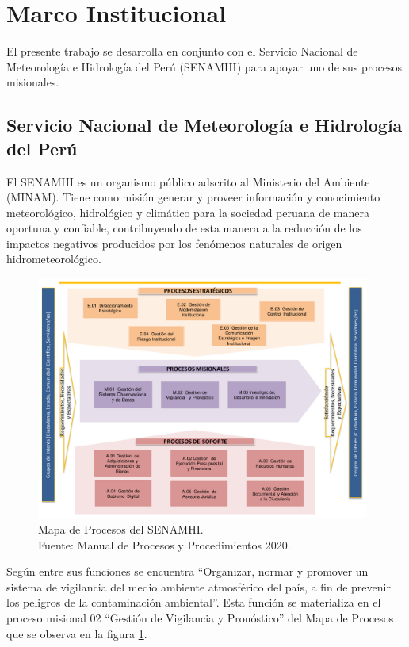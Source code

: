 \section{Marco Institucional}

El presente trabajo se desarrolla en conjunto con el Servicio Nacional de 
Meteorología e Hidrología del Perú (SENAMHI) para apoyar uno de sus procesos 
misionales.

\subsection{Servicio Nacional de Meteorología e Hidrología del Perú}

El SENAMHI es un organismo público adscrito al Ministerio del Ambiente (MINAM). 
Tiene como misión generar y proveer información y conocimiento meteorológico, 
hidrológico y climático para la sociedad peruana de manera oportuna y 
confiable, contribuyendo de esta manera a la reducción de los impactos 
negativos producidos por los fenómenos naturales de origen hidrometeorológico.

\begin{figure}[H]
  \centering
  \includegraphics[height=8cm]{E_IMAGENES/2_MarcoTeorico/mapro}
  \caption{
    Mapa de Procesos del SENAMHI.\\
    Fuente: Manual de Procesos y Procedimientos 2020.
  }
  \label{fig:mapro}
\end{figure}

Según \cite{senamhi2020rof} entre sus funciones se encuentra ``Organizar, normar 
y promover un sistema de vigilancia del medio ambiente atmosférico del país, a 
fin de prevenir los peligros de la contaminación ambiental''. Esta función se 
materializa en el proceso misional 02 ``Gestión de Vigilancia y Pronóstico'' del 
Mapa de Procesos que se observa en la figura \ref{fig:mapro}.

